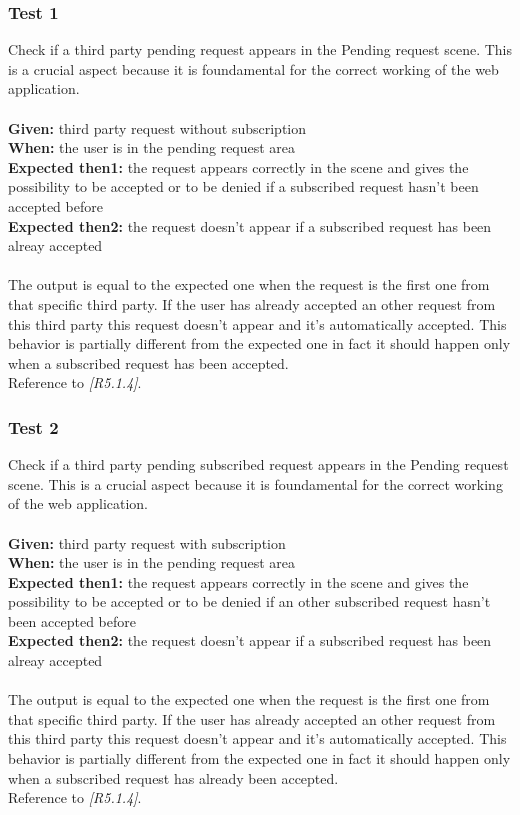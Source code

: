 \subsubsection{\Large{Test 1}}
Check if a third party pending request appears in the Pending request scene. This is a crucial aspect because it is foundamental for the correct working of the web application.  \\
\\
\textbf{Given: } third party request without subscription\\
\textbf{When: } the user is in the pending request area\\
\textbf{Expected then1: } the request appears correctly in the scene and gives the possibility to be accepted or to be denied if a subscribed request hasn't been accepted before \\
\textbf{Expected then2: } the request doesn't appear if a subscribed request has been alreay accepted \\
\\
The output is equal to the expected one when the request is the first one from that specific third party. If the user has already accepted an other request from this third party this request doesn't appear and it's automatically accepted. This behavior is partially different from the expected one in fact it should happen only when a subscribed request has been accepted.\\
Reference to \textit{[R5.1.4]}.

\subsubsection{\Large{Test 2}}
Check if a third party pending subscribed request appears in the Pending request scene. This is a crucial aspect because it is foundamental for the correct working of the web application.\\
\\
\textbf{Given: } third party request with subscription\\
\textbf{When: } the user is in the pending request area\\
\textbf{Expected then1: } the request appears correctly in the scene and gives the possibility to be accepted or to be denied if an other subscribed request hasn't been accepted before \\
\textbf{Expected then2: } the request doesn't appear if a subscribed request has been alreay accepted \\
\\
The output is equal to the expected one when the request is the first one from that specific third party. If the user has already accepted an other request from this third party this request doesn't appear and it's automatically accepted. This behavior is partially different from the expected one in fact it should happen only when a subscribed request has already been accepted.\\
Reference to \textit{[R5.1.4]}.

